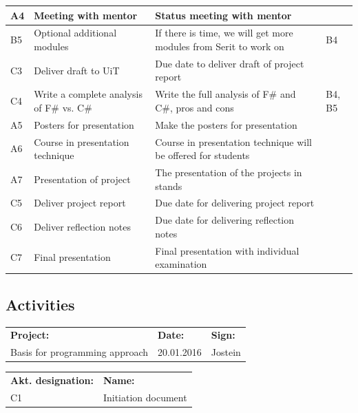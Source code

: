 \documentclass[12pt, a4paper]{article}
\begin{document}
\begin{tabularx}{\textwidth}{|p{10mm}|X|X|p{10mm}|}
	\hline
	A4&Meeting with mentor&Status meeting with mentor&\\
	\hline
	B5&Optional additional modules&If there is time, we will get more modules from Serit to work on&B4\\
	\hline
	C3&Deliver draft to UiT&Due date to deliver draft of project report&\\
	\hline
	C4&Write a complete analysis of F\# vs. C\#&Write the full analysis of F\# and C\#, pros and cons&B4, B5\\
	\hline
	A5&Posters for presentation&Make the posters for presentation&\\
	\hline
	A6&Course in presentation technique&Course in presentation technique will be offered for students&\\
	\hline
	A7&Presentation of project&The presentation of the projects in stands&\\
	\hline
	C5&Deliver project report&Due date for delivering project report&\\
	\hline
	C6&Deliver reflection notes&Due date for delivering reflection notes&\\
	\hline
	C7&Final presentation&Final presentation with individual examination&\\
	\hline
\end{tabularx}

\newpage

\subsection{Activities}

\small
\bgroup
\def\arraystretch{1.5}


\begin{tabularx}{\textwidth}{|X|p{32mm}|p{20mm}|}
	\hline
	\textbf{Project:}&\textbf{Date:}&\textbf{Sign:}\\
	Basis for programming approach&20.01.2016&Jostein\\
	\hline
\end{tabularx}

\begin{tabularx}{\textwidth}{|p{40mm}|X|}
	\textbf{Akt. designation:}&\textbf{Name:}\\
	C1&Initiation document\\
	\hline
\end{tabularx}
\end{document}
